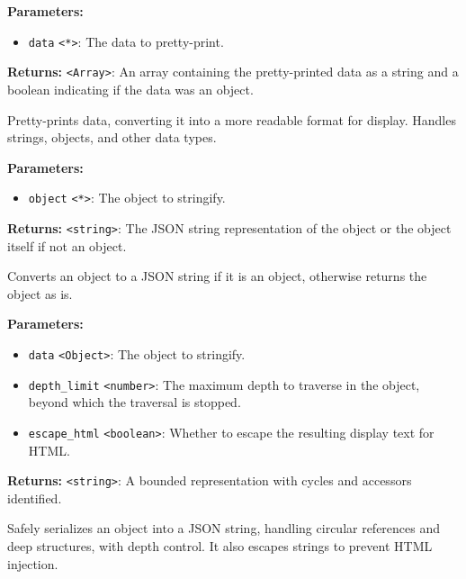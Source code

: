 \documentclass[12pt,a4paper]{article}
\begin{document}
\noindent \textbf{Parameters:}
\begin{itemize}
  \item \texttt{data} \texttt{<*>}: The data to pretty-print.
\end{itemize}

\noindent \textbf{Returns:} \texttt{<Array>}: An array containing the pretty-printed data as a string and a boolean indicating if the data was an object.

\noindent Pretty-prints data, converting it into a more readable format for display. Handles strings, objects, and other data types.

\vspace{5mm}
\noindent {}


\noindent \textbf{Parameters:}
\begin{itemize}
  \item \texttt{object} \texttt{<*>}: The object to stringify.
\end{itemize}

\noindent \textbf{Returns:} \texttt{<string>}: The JSON string representation of the object or the object itself if not an object.

\noindent Converts an object to a JSON string if it is an object, otherwise returns the object as is.

\vspace{5mm}
\noindent {}


\noindent \textbf{Parameters:}
\begin{itemize}
  \item \texttt{data} \texttt{<Object>}: The object to stringify.
  \item \texttt{depth\_limit} \texttt{<number>}: The maximum depth to traverse in the object, beyond which the traversal is stopped.
  \item \texttt{escape\_html} \texttt{<boolean>}: Whether to escape the resulting display text for HTML.
\end{itemize}

\noindent \textbf{Returns:} \texttt{<string>}: A bounded representation with cycles and accessors identified.

\noindent Safely serializes an object into a JSON string, handling circular references and deep structures, with depth control.
It also escapes strings to prevent HTML injection.
\end{document}
